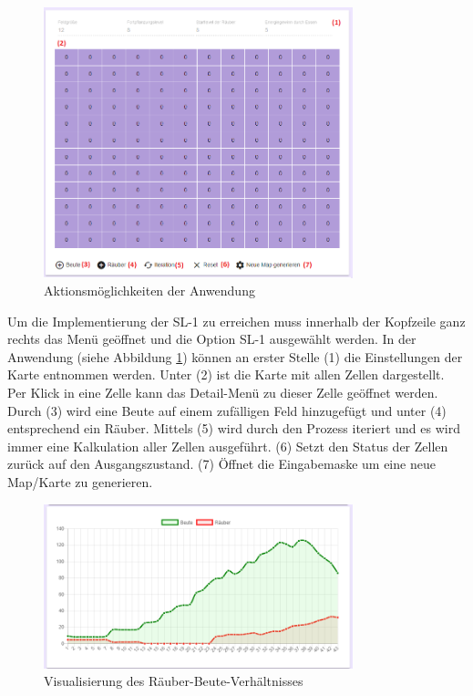 \documentclass[]{scrartcl}
\begin{document}
\begin{figure}[htbp]
	\centering
	\includegraphics[width=0.8\textwidth]{res/interface.png}
	\caption{Aktionsmöglichkeiten der Anwendung}
	\label{img:interface}
\end{figure}

Um die Implementierung der SL-1 zu erreichen muss innerhalb der Kopfzeile ganz rechts das Menü geöffnet und die Option SL-1 ausgewählt werden. In der Anwendung (siehe Abbildung \ref{img:interface}) können an erster Stelle (1) die Einstellungen der Karte entnommen werden. Unter (2) ist die Karte mit allen Zellen dargestellt. Per Klick in eine Zelle kann das Detail-Menü zu dieser Zelle geöffnet werden. Durch (3) wird eine Beute auf einem zufälligen Feld hinzugefügt und unter (4) entsprechend ein Räuber. Mittels (5) wird durch den Prozess iteriert und es wird immer eine Kalkulation aller Zellen ausgeführt. (6) Setzt den Status der Zellen zurück auf den Ausgangszustand. (7) Öffnet die Eingabemaske um eine neue Map/Karte zu generieren.\\

\begin{figure}[htbp]
	\centering
	\includegraphics[width=0.8\textwidth]{res/graph.png}
	\caption{Visualisierung des Räuber-Beute-Verhältnisses}
	\label{img:graph}
\end{figure}
\end{document}
